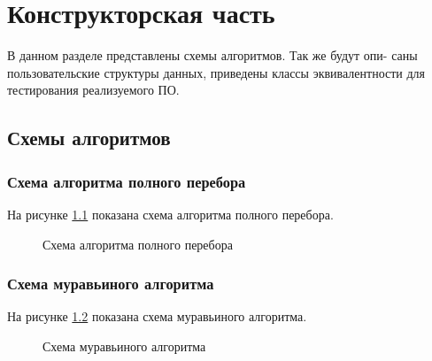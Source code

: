 
\chapter{Конструкторская часть}\label{Konstruct}

В данном разделе представлены схемы алгоритмов. Так же будут опи-
саны пользовательские структуры данных, приведены классы эквивалентности для тестирования реализуемого ПО.

\section{Схемы алгоритмов}\label{SchemaAlg}


\subsection{Схема алгоритма полного перебора}\label{SchemaPoslMatrixMultiply}

На рисунке \ref{ris:schemaposav} показана схема алгоритма полного перебора.

\begin{figure}[H]
  \caption{Схема алгоритма полного перебора}
  \label{ris:schemaposav}
\end{figure}

\subsection{Схема муравьиного алгоритма}\label{SchemaParRowMatrixMultiply}

На рисунке \ref{ris:schemaparrowav} показана схема муравьиного алгоритма.

\begin{figure}[H]
  \caption{Схема муравьиного алгоритма}
  \label{ris:schemaparrowav}
\end{figure}




